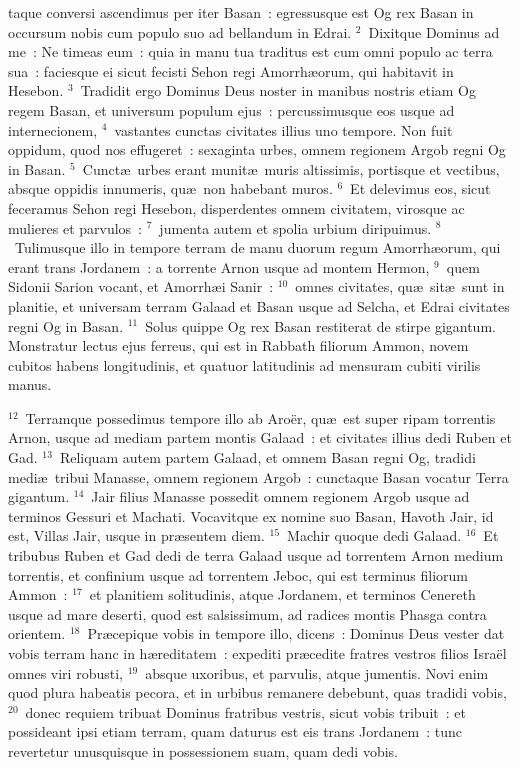 \bchapter
{}taque conversi ascendimus per iter Basan~: egressusque est Og rex Basan in occursum nobis cum populo suo ad bellandum in Edrai.
${}^{2}$~Dixitque Dominus ad me~: Ne timeas eum~: quia in manu tua traditus est cum omni populo ac terra sua~: faciesque ei sicut fecisti Sehon regi Amorrh\ae orum, qui habitavit in Hesebon.
${}^{3}$~Tradidit ergo Dominus Deus noster in manibus nostris etiam Og regem Basan, et universum populum ejus~: percussimusque eos usque ad internecionem,
${}^{4}$~vastantes cunctas civitates illius uno tempore. Non fuit oppidum, quod nos effugeret~: sexaginta urbes, omnem regionem Argob regni Og in Basan.
${}^{5}$~Cunct\ae\ urbes erant munit\ae\ muris altissimis, portisque et vectibus, absque oppidis innumeris, qu\ae\ non habebant muros.
${}^{6}$~Et delevimus eos, sicut feceramus Sehon regi Hesebon, disperdentes omnem civitatem, virosque ac mulieres et parvulos~:
${}^{7}$~jumenta autem et spolia urbium diripuimus.
${}^{8}$~Tulimusque illo in tempore terram de manu duorum regum Amorrh\ae orum, qui erant trans Jordanem~: a torrente Arnon usque ad montem Hermon,
${}^{9}$~quem Sidonii Sarion vocant, et Amorrh\ae i Sanir~:
${}^{10}$~omnes civitates, qu\ae\ sit\ae\ sunt in planitie, et universam terram Galaad et Basan usque ad Selcha, et Edrai civitates regni Og in Basan.
${}^{11}$~Solus quippe Og rex Basan restiterat de stirpe gigantum. Monstratur lectus ejus ferreus, qui est in Rabbath filiorum Ammon, novem cubitos habens longitudinis, et quatuor latitudinis ad mensuram cubiti virilis manus.


${}^{12}$~Terramque possedimus tempore illo ab Aro\"er, qu\ae\ est super ripam torrentis Arnon, usque ad mediam partem montis Galaad~: et civitates illius dedi Ruben et Gad.
${}^{13}$~Reliquam autem partem Galaad, et omnem Basan regni Og, tradidi medi\ae\ tribui Manasse, omnem regionem Argob~: cunctaque Basan vocatur Terra gigantum.
${}^{14}$~Jair filius Manasse possedit omnem regionem Argob usque ad terminos Gessuri et Machati. Vocavitque ex nomine suo Basan, Havoth Jair, id est, Villas Jair, usque in pr\ae sentem diem.
${}^{15}$~Machir quoque dedi Galaad.
${}^{16}$~Et tribubus Ruben et Gad dedi de terra Galaad usque ad torrentem Arnon medium torrentis, et confinium usque ad torrentem Jeboc, qui est terminus filiorum Ammon~:
${}^{17}$~et planitiem solitudinis, atque Jordanem, et terminos Cenereth usque ad mare deserti, quod est salsissimum, ad radices montis Phasga contra orientem.
${}^{18}$~Pr\ae cepique vobis in tempore illo, dicens~: Dominus Deus vester dat vobis terram hanc in h\ae reditatem~: expediti pr\ae cedite fratres vestros filios Isra\"el omnes viri robusti,
${}^{19}$~absque uxoribus, et parvulis, atque jumentis. Novi enim quod plura habeatis pecora, et in urbibus remanere debebunt, quas tradidi vobis,
${}^{20}$~donec requiem tribuat Dominus fratribus vestris, sicut vobis tribuit~: et possideant ipsi etiam terram, quam daturus est eis trans Jordanem~: tunc revertetur unusquisque in possessionem suam, quam dedi vobis.


